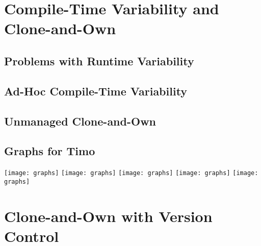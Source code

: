 \documentclass[
	aspectratio=169, %
	8pt, %
	handout, %
]{beamer}
\subtitle{3. Compile-Time Variability with Clone-and-Own}
\author{Timo Kehrer}
\begin{document}



\section{Compile-Time Variability and Clone-and-Own}




\subsection{Problems with Runtime Variability}
\subsection{Ad-Hoc Compile-Time Variability}
\subsection{Unmanaged Clone-and-Own}

\subsection{Graphs for Timo}
\begin{frame}{\myframetitle}
	\begin{mycolumns}[columns=5]
		\texttt{[image: graphs]}
	\mynextcolumn
		\texttt{[image: graphs]}
	\mynextcolumn
		\texttt{[image: graphs]}
	\mynextcolumn
		\texttt{[image: graphs]}
	\mynextcolumn
		\texttt{[image: graphs]}
	\end{mycolumns}
\end{frame}

\lessonslearned{
	\item \ldots
}{
	\item \ldots
}{
	\item \ldots
}

\sectionend

\section{Clone-and-Own with Version Control}
\end{document}
